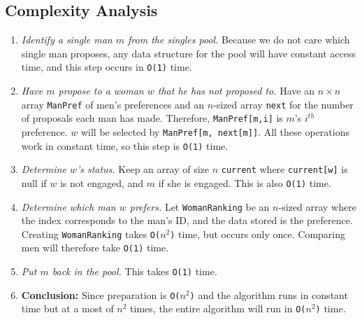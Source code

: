 \documentclass[11pt]{article}
\begin{document}
\subsection{Complexity Analysis}
\begin{enumerate}
    \item \textit{Identify a single man $m$ from the singles pool.} Because we do not care which single man proposes, any data structure for the pool will have constant access time, and this step occurs in \texttt{O(1)} time.
    \item \textit{Have $m$ propose to a woman $w$ that he has not proposed to.} Have an $n \times n$ array \texttt{ManPref} of men's preferences and an $n$-sized array \texttt{next} for the number of proposals each man has made. Therefore, \texttt{ManPref[m,i]} is $m$'s $i^{th}$ preference. $w$ will be selected by \texttt{ManPref[m, next[m]]}. All these operations work in constant time, so this step is \texttt{O(1)} time.
    \item \textit{Determine $w$'s status.} Keep an array of size $n$ \texttt{current} where \texttt{current[w]} is null if $w$ is not engaged, and $m$ if she is engaged. This is also \texttt{O(1)} time.
    \item \textit{Determine which man $w$ prefers.} Let \texttt{WomanRanking} be an $n$-sized array where the index corresponds to the man's ID, and the data stored is the preference. Creating \texttt{WomanRanking} takes \texttt{O($n^2$)} time, but occurs only once. Comparing men will therefore take \texttt{O(1)} time.
    \item \textit{Put $m$ back in the pool.} This takes \texttt{O(1)} time.
    \item \textbf{Conclusion:} Since preparation is \texttt{O($n^2$)} and the algorithm runs in constant time but at a most of $n^2$ times, the entire algorithm will run in \texttt{O($n^2$)} time.
\end{enumerate}
\end{document}
